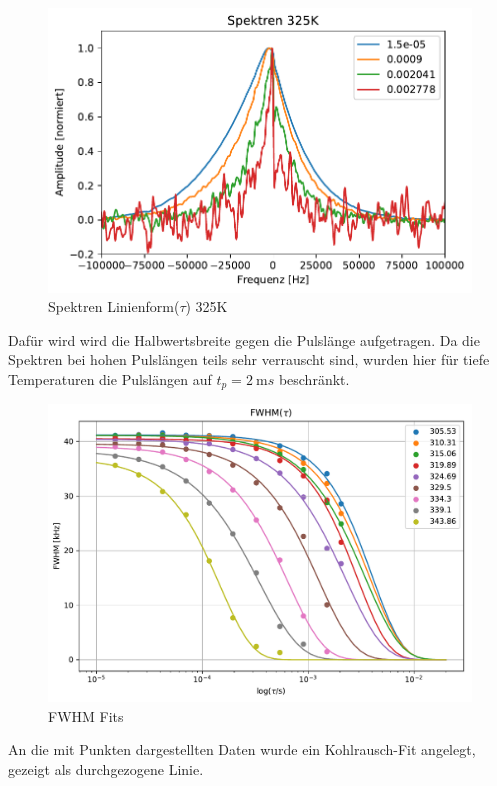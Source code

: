 \begin{figure}
	\begin{center}
		\includegraphics[width=\textwidth]{graphics/plots/SPEKDYN/spekdyn_325K.pdf}
	\end{center}
	\caption{Spektren Linienform($\tau$) 325K} \label{fig:res:spekdyn_325K}
\end{figure}

Dafür wird wird die Halbwertsbreite gegen die Pulslänge aufgetragen. Da die Spektren bei hohen Pulslängen teils sehr verrauscht sind, wurden hier für tiefe Temperaturen die Pulslängen auf $t_p = \SI{2}{\milli s}$ beschränkt.
\begin{figure}
	\begin{center}
		\includegraphics[width=\textwidth]{graphics/plots/SPEKDYN/spekdyn_fits.pdf}
	\end{center}
	\caption{FWHM Fits} \label{fig:res:spekdyn_fits}
\end{figure}
An die mit Punkten dargestellten Daten wurde ein Kohlrausch-Fit angelegt, gezeigt als durchgezogene Linie.

